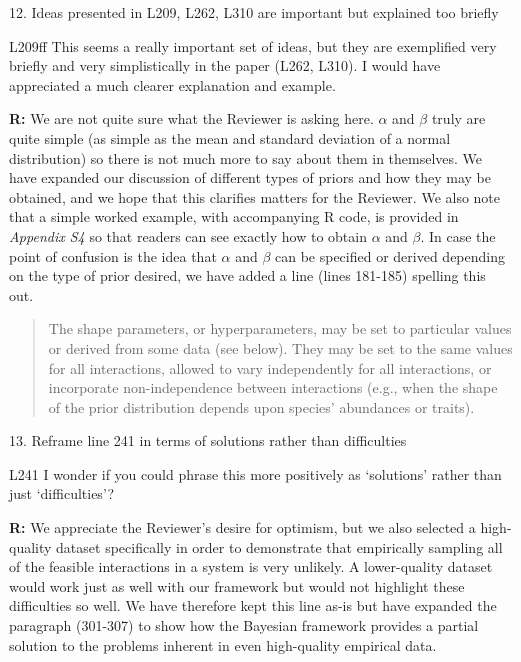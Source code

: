 \documentclass[12pt]{letter}
\newenvironment{refquote}{\bigskip \begin{it}}{\end{it}\smallskip}
\begin{document}
	12. Ideas presented in L209, L262, L310 are important but explained too briefly


		\begin{refquote}
		L209ff This seems a really important set of ideas, but they are exemplified very briefly and very simplistically in the paper (L262, L310). I would have appreciated a much clearer explanation and example.
		\end{refquote}


		\textbf{R:} We are not quite sure what the Reviewer is asking here. $\alpha$ and $\beta$ truly are quite simple (as simple as the mean and standard deviation of a normal distribution) so there is not much more to say about them in themselves. We have expanded our discussion of different types of priors and how they may be obtained, and we hope that this clarifies matters for the Reviewer. We also note that a simple worked example, with accompanying R code, is provided in \emph{Appendix S4} so that readers can see exactly how to obtain $\alpha$ and $\beta$. In case the point of confusion is the idea that $\alpha$ and $\beta$ can be specified or derived depending on the type of prior desired, we have added a line (lines 181-185) spelling this out.


		\begin{quotation}
			The shape parameters, or hyperparameters, may be set to particular values or derived from some data (see below). They may be set to the same values for all interactions, allowed to vary independently for all interactions, or incorporate non-independence between interactions (e.g., when the shape of the prior distribution depends upon species' abundances or traits). 
			\end{quotation}


	13. Reframe line 241 in terms of solutions rather than difficulties


		\begin{refquote}
		L241 I wonder if you could phrase this more positively as `solutions' rather than just `difficulties'?
		\end{refquote}


		\textbf{R:} We appreciate the Reviewer's desire for optimism, but we also selected a high-quality dataset specifically in order to demonstrate that empirically sampling all of the feasible interactions in a system is very unlikely. A lower-quality dataset would work just as well with our framework but would not highlight these difficulties so well. We have therefore kept this line as-is but have expanded the paragraph (301-307) to show how the Bayesian framework provides a partial solution to the problems inherent in even high-quality empirical data.
\end{document}
